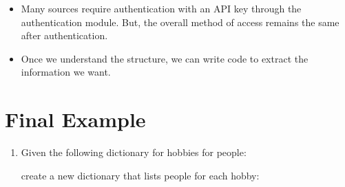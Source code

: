 \documentclass[letterpaper,10pt,english]{sphinxmanual}
\begin{document}
\begin{itemize}
\begin{itemize}
\end{itemize}

\item {} 
Many sources require authentication with an API key through the
 authentication module. But, the overall method of access
remains the same after authentication.

\item {} 
Once we understand the structure, we can write code to extract the
information we want.

\end{itemize}


\section{Final Example}
\label{\detokenize{lecture_notes/lec17_dictionaries2:final-example}}\begin{enumerate}
\item {} 
Given the following dictionary for hobbies for people:

%
\begin{sphinxVerbatim}[commandchars=\\\{\}]
  \PYG{p}{[}\PYG{p}{]} \PYG{p}{[}\PYG{p}{]}
\end{sphinxVerbatim}

create a new dictionary that lists people for each hobby:

%
\begin{sphinxVerbatim}[commandchars=\\\{\}]
   
\end{sphinxVerbatim}

\end{enumerate}
\end{document}
